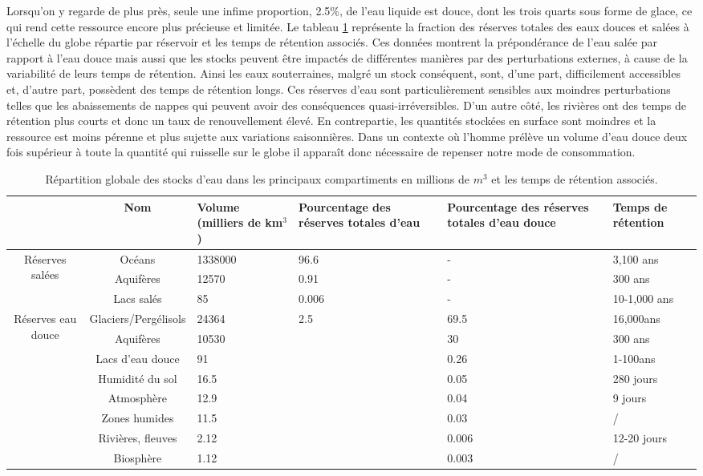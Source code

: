 Lorsqu'on y regarde de plus près, seule une infime proportion, 2.5\%, de l'eau liquide est douce, dont les trois quarts sous forme de glace, ce qui rend cette ressource encore plus précieuse et limitée. Le tableau \ref{repartition_eau} représente la fraction des réserves totales des eaux douces et salées à l'échelle du globe répartie par réservoir et les temps de rétention associés. Ces données montrent la prépondérance de l'eau salée par rapport à l'eau douce mais aussi que les stocks peuvent être impactés de différentes manières par des perturbations externes, à cause de la variabilité de leurs temps de rétention. Ainsi les eaux souterraines, malgré un stock conséquent, sont, d'une part, difficilement accessibles et, d'autre part, possèdent des temps de rétention longs. Ces réserves d'eau sont particulièrement sensibles aux moindres perturbations telles que les abaissements de nappes qui peuvent avoir des conséquences quasi-irréversibles. D'un autre côté, les rivières ont des temps de rétention plus courts et donc un taux de renouvellement élevé. En contrepartie, les quantités stockées en surface sont moindres et la ressource est moins pérenne et plus sujette aux variations saisonnières. Dans un contexte où l'homme prélève un volume d'eau douce deux fois supérieur à toute la quantité qui ruisselle sur le globe il apparaît donc nécessaire de repenser notre mode de consommation. \\

\begin{table}[h!]
 \caption{Répartition globale des stocks d'eau dans les principaux compartiments en millions de $m^{3}$ et les temps de rétention associés.}
 \label{repartition_eau}
 \begin{tabularx}{\textwidth}{ccXXXX}
 \hline
 &\footnotesize{Nom}&\footnotesize{Volume (milliers de km$^3$)}& \footnotesize{Pourcentage des réserves totales d'eau}& \footnotesize{Pourcentage des réserves totales d'eau douce}& \footnotesize{Temps de rétention}\\
 \hline
 \multirow{3}{1.5cm}{Réserves salées}&Océans&1338000&96.6&-&3,100 ans\\
  &Aquifères&12570&0.91&-&300 ans\\
  &Lacs salés&85&0.006&-&10-1,000 ans\\
  \hline
 \multirow{8}{1.5cm}{Réserves eau douce} &Glaciers/Pergélisols&24364&\multirow{8}{1.5cm}{2.5}&69.5&16,000ans\\
  &Aquifères&10530&&30&300 ans\\
  &Lacs d'eau douce&91&&0.26&1-100ans\\
  &Humidité du sol&16.5&&0.05&280 jours\\
  &Atmosphère&12.9&&0.04&9 jours\\
  &Zones humides&11.5&&0.03&/\\
  &Rivières, fleuves&2.12&&0.006&12-20 jours\\ 
  &Biosphère&1.12&&0.003&/\\  
  \hline
 \end{tabularx}
\end{table}

